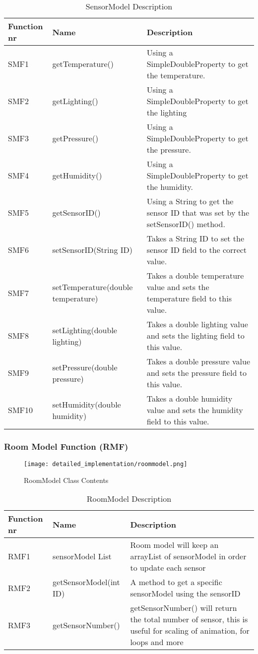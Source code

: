 \documentclass[../document]{subfiles}
\begin{document}
\begin{table}[H]
\caption{SensorModel Description}
\centering
\begin{tabularx}{\textwidth}{|l|l|X|}
	\hline
	Function nr
	&Name
	&Description
	\\ \hline SMF1 
	&getTemperature()
	&Using a SimpleDoubleProperty to get the temperature.
	\\ \hline SMF2
	&getLighting()
	&Using a SimpleDoubleProperty to get the lighting
	\\ \hline SMF3
	&getPressure()
	&Using a SimpleDoubleProperty to get the pressure.
	\\ \hline SMF4
	&getHumidity()
	&Using a SimpleDoubleProperty to get the humidity.
	\\ \hline SMF5
	&getSensorID()
	&Using a String to get the sensor ID that was set by the setSensorID() method.
	\\ \hline SMF6
	&setSensorID(String ID)
	&Takes a String ID to set the sensor ID field to the correct value.
	\\ \hline SMF7
	&setTemperature(double temperature)
	&Takes a double temperature value and sets the temperature field to this value.
	\\ \hline SMF8
	&setLighting(double lighting)
	&Takes a double lighting value and sets the lighting field to this value.
	\\ \hline SMF9
	&setPressure(double pressure)
	&Takes a double pressure value and sets the pressure field to this value.
	\\ \hline SMF10
	&setHumidity(double humidity)
	&Takes a double humidity value and sets the humidity field to this value.
	\\ \hline 
\end{tabularx}
\end{table}

\subsubsection{Room Model Function (RMF)}

\begin{figure}[H]
\centering
\texttt{[image: detailed\_implementation/roommodel.png]}
\caption{RoomModel Class Contents}
\end{figure}

\begin{table}[H]
\caption{RoomModel Description}
\centering
\begin{tabularx}{\textwidth}{|l|l|X|}
	\hline
	Function nr
	&Name
	&Description
	\\ \hline RMF1
	&sensorModel List
	&Room model will keep an arrayList of sensorModel in order to update each sensor
	\\ \hline RMF2
	&getSensorModel(int ID)
	&A method to get a specific sensorModel using the sensorID
	\\ \hline RMF3
	&getSensorNumber()
	&getSensorNumber() will return the total number of sensor, this is useful for scaling of animation, for loops and more
	\\ \hline 
\end{tabularx}
\end{table}
\end{document}
